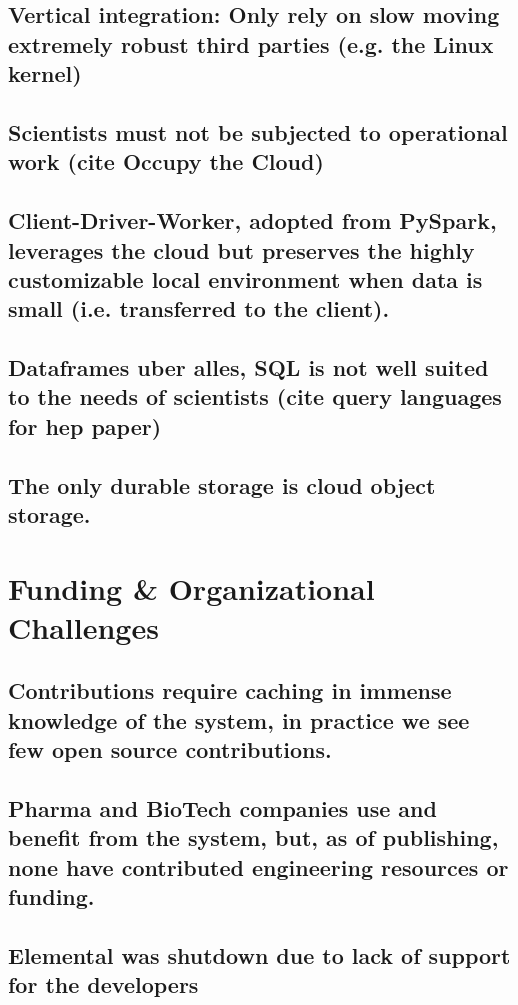 \documentclass[10pt,a4paper%
]{article}
\begin{document}
\subsection{Vertical integration: Only rely on slow moving extremely robust third parties (e.g. the Linux kernel)}

\subsection{Scientists must not be subjected to operational work (cite Occupy the Cloud)}

\subsection{Client-Driver-Worker, adopted from PySpark, leverages the cloud but preserves the highly customizable local environment when data is small (i.e. transferred to the client).}

\subsection{Dataframes uber alles, SQL is not well suited to the needs of scientists (cite query languages for hep paper)}

\subsection{The only durable storage is cloud object storage.}

\section{Funding \& Organizational Challenges}

\subsection{Contributions require caching in immense knowledge of the system, in practice we see few open source contributions.}

\subsection{Pharma and BioTech companies use and benefit from the system, but, as of publishing, none have contributed engineering resources or funding.}

\subsection{Elemental was shutdown due to lack of support for the developers}
\end{document}
